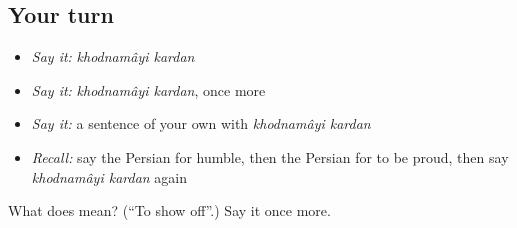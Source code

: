 \subsection*{Your turn}
\begin{itemize}
\raggedright
  \item \emph{Say it:} \emph{khodnamâyi kardan}
  \item \emph{Say it:} \emph{khodnamâyi kardan}, once more
  \item \emph{Say it:} a sentence of your own with \emph{khodnamâyi kardan}
  \item \emph{Recall:} say the Persian for humble, then the Persian for to be proud, then say \emph{khodnamâyi kardan} again
\end{itemize}

\begin{tcolorbox}[breakable,colback=teal!4,colframe=teal!35!black,title={Before you move on}]
What does   mean? (\textquotedblleft{}To show off\textquotedblright{}.) Say it once more.
\end{tcolorbox}
